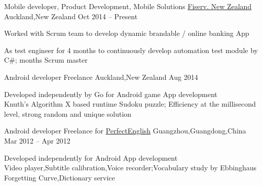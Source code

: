 
\begin{cventries}
	\cventry
	{Mobile developer, Product Development, Mobile Solutions}
	{\href{https://www.careers.fiserv.com/new-zealand}{Fiserv. New Zealand}}
	{Auckland,\enskip New Zealand}
	{Oct 2014 – Present}
	{
		\begin{cvitems}
			\item {Worked with Scrum team to develop dynamic brandable \href{https://play.google.com/store/apps/details?id=com.fiserv.touchbankingasp&hl=en}{\color{deepblue}{Android}}/\href{https://itunes.apple.com/us/app/touchbanking/id386678211?mt=8}{\color{deepblue}{iPhone}} online banking App}
			\item {As test engineer for 4 months to continuously develop automation test module by C\#; months Scrum master}
		\end{cvitems}
	}
\end{cventries}

\begin{cventries}
	\cventry
	{Android developer}
	{Freelance}
	{Auckland,\enskip New Zealand}
	{Aug 2014}
	{
		\begin{cvitems}
			\item {Developed independently by Go for Android \href{https://play.google.com/store/apps/details?id=com.gmail.jiangyang5157.sudoku}{\color{deepblue}{Sudoku}} game App development\\
			Knuth's Algorithm X based runtime Sudoku puzzle;\enskip
			Efficiency at the millisecond level, strong random and unique solution}
		\end{cvitems}
	}
\end{cventries}

\begin{cventries}
	\cventry
	{Android developer}
	{Freelance for \href{http://www.english119.cn}{PerfectEnglish}}
	{Guangzhou,\enskip Guangdong,\enskip China}
	{Mar 2012 – Apr 2012}
	{
		\begin{cvitems}
			\item {Developed independently for Android \href{http://shouji.baidu.com/software/11415668.html}{\color{deepblue}{PerfectEnglish}} App development\\
			Video player,\enskip Subtitle calibration,\enskip Voice recorder;\enskip Vocabulary study by Ebbinghaus Forgetting Curve,\enskip Dictionary service}
		\end{cvitems}
	}
\end{cventries}

